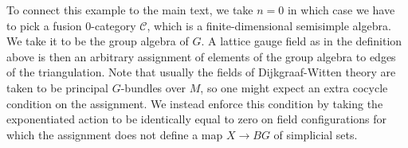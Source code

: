 \begin{example}
To connect this example to the main text, we take $n = 0$ in which case we have to pick a fusion $0$-category $\mathcal{C}$, which is a finite-dimensional semisimple algebra.
We take it to be the group algebra of $G$.
A lattice gauge field as in the definition above is then an arbitrary assignment of elements of the group algebra to edges of the triangulation.
Note that usually the fields of Dijkgraaf-Witten theory are taken to be principal $G$-bundles over $M$, so one might expect an extra cocycle condition on the assignment.
We instead enforce this condition by taking the exponentiated action to be identically equal to zero on field configurations for which the assignment does not define a map $X \to BG$ of simplicial sets.
\end{example}

\begin{example}
\end{example}